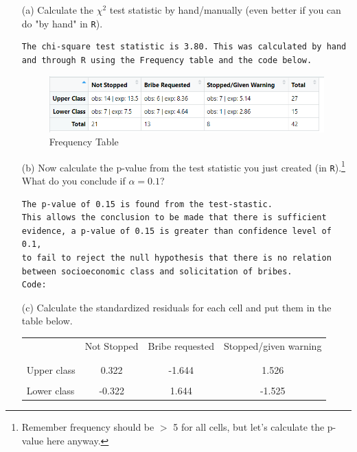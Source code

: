 \documentclass[12pt,letterpaper]{article}
\begin{document}
\begin{enumerate}
	\item [(a)]
	Calculate the $\chi^2$ test statistic by hand/manually (even better if you can do "by hand" in \texttt{R}).
\begin{Verbatim}
The chi-square test statistic is 3.80. This was calculated by hand 
and through R using the Frequency table and the code below.
\end{Verbatim}
\begin{figure}[h!]\centering
	\caption{\footnotesize Frequency Table}
	\label{fig:Table 1}
	\includegraphics[width=.85\textwidth]{frequencies.png}
\end{figure}
  
	
	\item [(b)]
	Now calculate the p-value from the test statistic you just created (in \texttt{R}).\footnote{Remember frequency should be $>$ 5 for all cells, but let's calculate the p-value here anyway.}  What do you conclude if $\alpha = 0.1$?\\
\begin{Verbatim}
The p-value of 0.15 is found from the test-stastic. 
This allows the conclusion to be made that there is sufficient 
evidence, a p-value of 0.15 is greater than confidence level of 0.1, 
to fail to reject the null hypothesis that there is no relation 
between socioeconomic class and solicitation of bribes. 
Code:
\end{Verbatim}
  
	\item [(c)] Calculate the standardized residuals for each cell and put them in the table below.
	\vspace{1cm}
	
	\begin{table}[h]
		\centering
		\begin{tabular}{l | c c c }
			& Not Stopped & Bribe requested & Stopped/given warning \\
			\\[-1.8ex] 
			\hline \\[-1.8ex]
			Upper class  & 0.322 & -1.644  & 1.526  \\
			\\
			Lower class & -0.322 & 1.644  & -1.525  \\
		\end{tabular}
	\end{table}
  


\end{enumerate}
\end{document}
